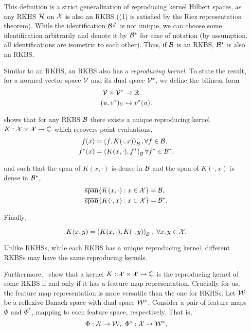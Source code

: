 This definition is a strict generalization of reproducing kernel Hilbert spaces, as any RKHS ${\mathcal{H}}$ on ${\mathcal{X}}$ is also an RKBS ((1) is satisfied by the Riez representation theorem). While the identification ${\mathcal{B}}^\#$ is not unique, we can choose some identification arbitrarily and denote it by ${\mathcal{B}}^*$ for ease of notation (by assumption, all identifications are isometric to each other). Thus, if ${\mathcal{B}}$ is an RKBS, ${\mathcal{B}}^*$ is also an RKBS.

Similar to an RKHS, an RKBS also has a \textit{reproducing kernel}. To state the result, for a normed vector space ${\mathcal{V}}$ and its dual space ${\mathcal{V}}^*$, we define the bilinear form
\begin{equation}\label{eq:bilinear_form}
    \begin{split}
        {\mathcal{V}} \times {\mathcal{V}}^* &\to \mathbb{R}\\
        (u, v^*)_{\mathcal{V}} &\mapsto v^*(u).
    \end{split}
\end{equation}

\parencite[Theorem 2]{zhangReproducingKernel2009} shows that for any RKBS ${\mathcal{B}}$ there exists a unique reproducing kernel $K: {\mathcal{X}} \times {\mathcal{X}} \to {\mathbb{C}}$ which recovers point evaluations,
\begin{align}
    f(x) &= \left(f, K(\cdot, x)\right)_{\mathcal{B}}, \forall f \in {\mathcal{B}}, \\
    f^*(x) &= \left(K(x, \cdot), f^*\right)_{\mathcal{B}} \forall f^* \in {\mathcal{B}}^*,
\end{align}

and such that the span of $K(x, \cdot)$ is dense in ${\mathcal{B}}$ and the span of $K(\cdot, x)$ is dense in ${\mathcal{B}}^*$,
\begin{align}
    \overline{\text{span}}\{K(x, \cdot): x \in {\mathcal{X}}\} &= {\mathcal{B}}, \\
    \overline{\text{span}}\{K(\cdot, x): x \in {\mathcal{X}}\} &= {\mathcal{B}}^*.
\end{align}

Finally,

\begin{equation}
    K(x, y) = \left(K(x, \cdot), K(\cdot, y)\right)_{\mathcal{B}}, \ \forall x, y \in {\mathcal{X}}.
\end{equation}

Unlike RKHSs, while each RKBS has a unique reproducing kernel, different RKBSs may have the same reproducing kernels.

Furthermore,~\parencite[Theorems 3 and 4]{zhangReproducingKernel2009} show that a kernel $K: {\mathcal{X}} \times {\mathcal{X}} \to {\mathbb{C}}$ is the reproducing kernel of some RKBS if and only if it has a feature map representation. Crucially for us, the feature map representation is more versatile than the one for RKHSs. Let ${\mathcal{W}}$ be a reflexive Banach space with dual space ${\mathcal{W}}^*$. Consider a pair of feature maps $\Phi$ and $\Phi^*$, mapping to each feature space, respectively. That is,
\begin{equation*}
    \Phi: {\mathcal{X}} \to {\mathcal{W}}, \ \Phi^*: {\mathcal{X}} \to {\mathcal{W}}^*,
\end{equation*}


